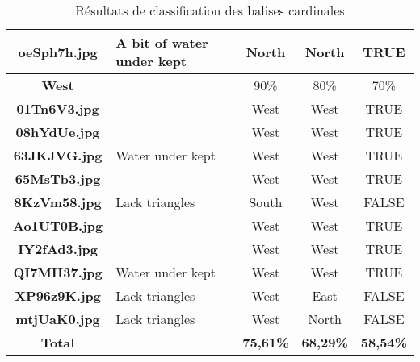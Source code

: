 \documentclass{article}
\begin{document}
\begin{table}[h!]
{\begin{tabular}{|c|p{4cm}|c|c|c|}
            \rowcolor{gray!0}
            \textbf{oeSph7h.jpg} & A bit of water under kept    & North                         & North                            & TRUE                 \\ \hline
            \rowcolor{gray!40}
            \textbf{West}        &                              & 90\%                          & 80\%                             & 70\%                 \\ \hline
            \rowcolor{gray!0}
            \textbf{01Tn6V3.jpg} &                              & West                          & West                             & TRUE                 \\ \hline
            \rowcolor{gray!10}
            \textbf{08hYdUe.jpg} &                              & West                          & West                             & TRUE                 \\ \hline
            \rowcolor{gray!0}
            \textbf{63JKJVG.jpg} & Water under kept             & West                          & West                             & TRUE                 \\ \hline
            \rowcolor{gray!10}
            \textbf{65MsTb3.jpg} &                              & West                          & West                             & TRUE                 \\ \hline
            \rowcolor{gray!0}
            \textbf{8KzVm58.jpg} & Lack triangles               & South                         & West                             & FALSE                \\ \hline
            \rowcolor{gray!10}
            \textbf{Ao1UT0B.jpg} &                              & West                          & West                             & TRUE                 \\ \hline
            \rowcolor{gray!0}
            \textbf{IY2fAd3.jpg} &                              & West                          & West                             & TRUE                 \\ \hline
            \rowcolor{gray!10}
            \textbf{QI7MH37.jpg} & Water under kept             & West                          & West                             & TRUE                 \\ \hline
            \rowcolor{gray!0}
            \textbf{XP96z9K.jpg} & Lack triangles               & West                          & East                             & FALSE                \\ \hline
            \rowcolor{gray!10}
            \textbf{mtjUaK0.jpg} & Lack triangles               & West                          & North                            & FALSE                \\ \hline
            \rowcolor{gray!40}
            \textbf{Total}       &                              & \textbf{75,61\%}              & \textbf{68,29\%}                 & \textbf{58,54\%}     \\ \hline
        \end{tabular}%
    }
    \caption{Résultats de classification des balises cardinales}\label{tab:segmentation_results}
\end{table}
\end{document}
